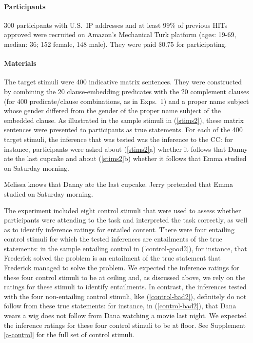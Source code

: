 \documentclass[11pt,fleqn]{article}
\newcommand{\6}{\mbox{$[\hspace*{-.6mm}[$}}
\newcommand{\9}{\mbox{$]\hspace*{-.6mm}]$}}
\begin{document}
\paragraph{Participants} 300 participants with U.S.\ IP addresses and at least 99\% of previous HITs approved were recruited on Amazon's Mechanical Turk platform (ages: 19-69, median: 36; 152 female, 148 male). They were paid \$0.75 for participating.

\paragraph{Materials} The target stimuli were 400 indicative matrix sentences. They were constructed by combining the 20 clause-embedding predicates with the 20 complement clauses (for 400 predicate/clause combinations, as in Exps.~1) and a proper name subject whose gender differed from the gender of the proper name subject of the embedded clause. As illustrated in the sample stimuli in (\ref{stims2}), these matrix sentences were presented to participants as true statements. For each of the 400 target stimuli, the inference that was tested was the inference to the CC: for instance, participants were asked about (\ref{stims2}a) whether it follows that Danny ate the last cupcake and about (\ref{stims2}b) whether it follows that Emma studied on Saturday morning.

\begin{exe}
\ex\label{stims2}
\begin{xlist}
 Melissa knows that Danny ate the last cupcake.
 Jerry pretended that Emma studied on Saturday morning.
\end{xlist}
\end{exe}

The experiment included eight control stimuli that were used to assess whether participants were attending to the task and interpreted the task correctly, as well as to identify inference ratings for entailed content. There were four entailing control stimuli for which the tested inferences are entailments of the true statements: in the sample entailing control in (\ref{control-good2}), for instance, that Frederick solved the problem is an entailment of the true statement that Frederick managed to solve the problem. We expected the inference ratings for these four control stimuli to be at ceiling and, as discussed above, we rely on the ratings for these stimuli to identify entailments. In contrast, the inferences tested with the four non-entailing control stimuli, like (\ref{control-bad2}), definitely do not follow from these true statements: for instance, in (\ref{control-bad2}), that Dana wears a wig does not follow from Dana watching a movie last night. We expected the inference ratings for these four control stimuli to be at floor. See Supplement \ref{a-control} for the full set of control stimuli.
\end{document}
